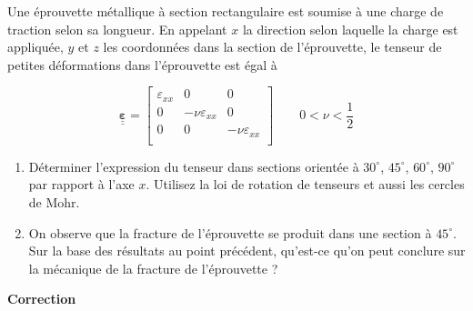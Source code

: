 \documentclass
[
a4paper,                      %
twoside,					  %
12pt,                         %
abstract,		      %
fleqn,                        %
]
{scrartcl} %
\begin{document}
Une \'eprouvette m\'etallique \`a section rectangulaire est soumise \`a une charge de traction selon sa longueur. En appelant $x$ la direction selon laquelle la charge est appliqu\'ee, $y$ et $z$ les coordonn\'ees dans la section de l'\'eprouvette, le tenseur de petites d\'eformations dans l'\'eprouvette est \'egal \`a

\begin{equation}
\mathbf{\underline{\underline{\varepsilon}}}=\begin{bmatrix}
\varepsilon_{xx}&0&0\\
0&-\nu\varepsilon_{xx}&0\\
0&0&-\nu\varepsilon_{xx}\\
\end{bmatrix}\qquad0<\nu<\frac{1}{2}
\end{equation}

\begin{enumerate}
\item D\'eterminer l'expression du tenseur dans sections orient\'ee \`a $30^{\circ}$, $45^{\circ}$, $60^{\circ}$, $90^{\circ}$ par rapport \`a l'axe $x$. Utilisez la loi de rotation de tenseurs et aussi les cercles de Mohr. 
\item On observe que la fracture de l'\'eprouvette se produit dans une section \`a $45^{\circ}$. Sur la base des r\'esultats au point pr\'ec\'edent, qu'est-ce qu'on peut conclure sur la m\'ecanique de la fracture de l'\'eprouvette ? 
\end{enumerate}

\newpage
\textbf{Correction}
\end{document}
